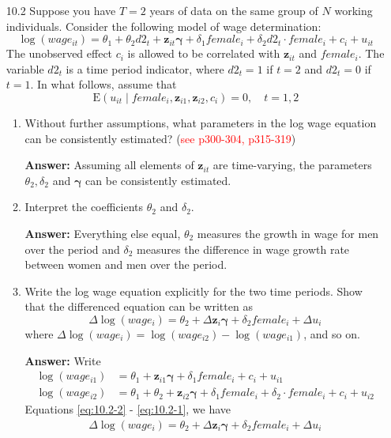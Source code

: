 \begin{enumerate}
    \item[10.2] Suppose you have $T=2$ years of data on the same group of $N$ working individuals. Consider the following model of wage determination:
    \[ \log \left(wage_{it}\right)=\theta_{1}+\theta_{2} d 2_{t}+\mathbf{z}_{i t} \bm{\gamma}+\delta_{1} female_{i}+\delta_{2} d 2_{t} \cdot female_{i}+c_{i}+u_{i t} \]
    The unobserved effect $c_{i}$ is allowed to be correlated with $\mathbf{z}_{i t}$ and $female_{i}$. The variable $d 2_{t}$ is a time period indicator, where $d 2_{t}=1$ if $t=2$ and $d 2_{t}=0$ if $t=1$. In what follows, assume that
    \[ \mathrm{E}\left(u_{i t} \mid female_{i}, \mathbf{z}_{i 1}, \mathbf{z}_{i 2}, c_{i}\right)=0, \quad t=1,2 \]
    
    \begin{enumerate}
        \item Without further assumptions, what parameters in the log wage equation can be consistently estimated? (\textcolor{red}{see p300-304, p315-319})
        
        \textbf{Answer:} Assuming all elements of $\mathbf{z}_{it}$ are time-varying, the parameters $\theta_2, \delta_2$ and $\mathbf{\gamma}$ can be consistently estimated.
        
        \item Interpret the coefficients $\theta_{2}$ and $\delta_{2}$.
        
        \textbf{Answer:} Everything else equal, $\theta_2$ measures the growth in wage for men over the period and $\delta_2$ measures the difference in wage growth rate between women and men over the period.
        
        \item Write the log wage equation explicitly for the two time periods. Show that the differenced equation can be written as
        \[ \Delta \log \left(wage_{i}\right)=\theta_{2}+\Delta \mathbf{z}_{i} \bm{\gamma}+\delta_{2} female_{i}+\Delta u_{i} \]
        where $\Delta \log \left( wage_{i}\right)=\log \left(wage_{i 2}\right)-\log \left(wage_{i 1}\right)$, and so on.
        
        \textbf{Answer:} Write
        \begin{align}
            \log \left(wage_{i1}\right)&=\theta_{1}+\mathbf{z}_{i1} \bm{\gamma}+\delta_{1} female_{i}+c_{i}+u_{i1} \label{eq:10.2-1} \\
            \log \left(wage_{i2}\right)&=\theta_{1}+\theta_{2}+\mathbf{z}_{i 2} \bm{\gamma}+\delta_{1} female_{i}+\delta_{2} \cdot female_{i}+c_{i}+u_{i2} \label{eq:10.2-2}
        \end{align}
        Equations \eqref{eq:10.2-2} - \eqref{eq:10.2-1}, we have
        \begin{gather}
            \Delta \log \left(wage_{i}\right)=\theta_{2}+\Delta \mathbf{z}_{i} \bm{\gamma}+\delta_{2} female_{i}+\Delta u_{i} \label{eq:10.2-3}
        \end{gather}
        

\end{enumerate}
\end{enumerate}
